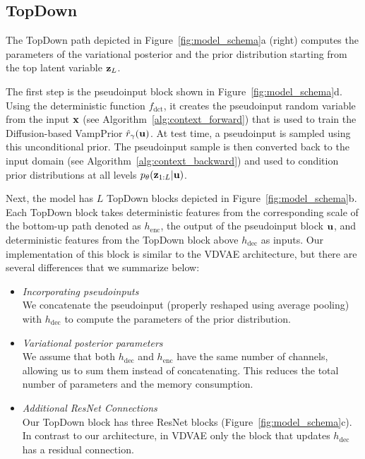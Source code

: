  \subsection{TopDown} \label{subsec:arch_decode}
The TopDown path depicted in Figure~\ref{fig:model_schema}a (right) computes the parameters of the variational posterior and the prior distribution starting from the top latent variable ${\mathbf{z}}_L$. 

The first step is the pseudoinput block shown in Figure~\ref{fig:model_schema}d. Using the deterministic function $f_{\text{dct}}$, it creates the pseudoinput random variable from the input ${\mathbf{x}}$ (see Algorithm~\ref{alg:context_forward}) that is used to train the Diffusion-based VampPrior $\hat{r}_{\gamma}({\mathbf{u}})$.
At test time, a pseudoinput is sampled using this unconditional prior. The pseudoinput sample is then converted back to the input domain (see Algorithm~\ref{alg:context_backward}) and used to condition prior distributions at all levels $p_{\theta}({\mathbf{z}}_{1:L}|{\mathbf{u}})$.

Next, the model has $L$ TopDown blocks depicted in Figure~\ref{fig:model_schema}b. 
Each TopDown block takes deterministic features from the corresponding scale of the bottom-up path denoted as $h_{\text{enc}}$, the output of the pseudoinput block ${\mathbf{u}}$, and deterministic features from the TopDown block above $h_{\text{dec}}$ as inputs. Our implementation of this block is similar to the VDVAE architecture, but there are several differences that we summarize below:
\begin{itemize}%
    \item \textit{Incorporating pseudoinputs}\\
    We concatenate the pseudoinput (properly reshaped using average pooling) with $h_{\text{dec}}$ to compute the parameters of the prior distribution. 
    \item \textit{Variational posterior parameters} \\
    We assume that both $h_{\text{dec}}$ and $h_{\text{enc}}$ have the same number of channels, allowing us to sum them instead of concatenating. This reduces the total number of parameters and the memory consumption.
    \item \textit{Additional ResNet Connections}\\
    Our TopDown block has three ResNet blocks (Figure~\ref{fig:model_schema}c). In contrast to our architecture, in VDVAE only the block that updates $h_{\text{dec}}$ has a residual connection. 
\end{itemize}

